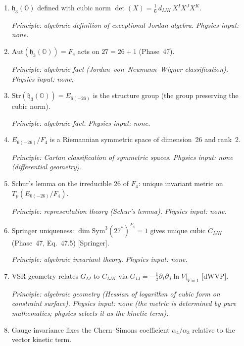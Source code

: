 \begin{enumerate}
  \item[(i)] $\mathfrak{h}_3(\mathbb{O})$ defined with cubic norm
    $\det(X) = \frac{1}{6}\,d_{IJK}\,X^I X^J X^K$.

    \textit{Principle: algebraic definition of exceptional Jordan algebra.}
    \textit{Physics input: none.}

  \item[(ii)] $\mathrm{Aut}(\mathfrak{h}_3(\mathbb{O})) = F_4$ acts on
    $27 = 26 + 1$ (Phase~47).

    \textit{Principle: algebraic fact (Jordan--von~Neumann--Wigner
    classification).}
    \textit{Physics input: none.}

  \item[(iii)] $\mathrm{Str}(\mathfrak{h}_3(\mathbb{O})) = E_{6(-26)}$ is
    the structure group (the group preserving the cubic norm).

    \textit{Principle: algebraic fact.}
    \textit{Physics input: none.}

  \item[(iv)] $E_{6(-26)}/F_4$ is a Riemannian symmetric space of
    dimension~26 and rank~2.

    \textit{Principle: Cartan classification of symmetric spaces.}
    \textit{Physics input: none (differential geometry).}

  \item[(v)] Schur's lemma on the irreducible 26 of $F_4$:
    unique invariant metric on $T_p(E_{6(-26)}/F_4)$.

    \textit{Principle: representation theory (Schur's lemma).}
    \textit{Physics input: none.}

  \item[(vi)] Springer uniqueness: $\dim\mathrm{Sym}^3(27^*)^{F_4} = 1$
    gives unique cubic $C_{IJK}$ (Phase~47, Eq.~47.5) [Springer].

    \textit{Principle: algebraic invariant theory.}
    \textit{Physics input: none.}

  \item[(vii)] VSR geometry relates $G_{IJ}$ to $C_{IJK}$ via
    $G_{IJ} = -\frac{1}{2}\partial_I\partial_J\ln V|_{V=1}$ [dWVP].

    \textit{Principle: algebraic geometry (Hessian of logarithm of
    cubic form on constraint surface).}
    \textit{Physics input: none (the metric is determined by pure
    mathematics; physics selects it as the kinetic term).}

  \item[(viii)] Gauge invariance fixes the Chern--Simons coefficient
    $\alpha_4/\alpha_3$ relative to the vector kinetic term.


\end{enumerate}
